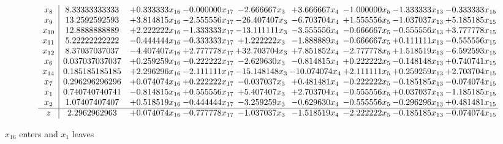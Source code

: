 \documentclass[10pt]{article}
\begin{document}
 \[\begin{array}{c| c c@{\hskip 2pt} c@{\hskip 2pt} c@{\hskip 2pt} c@{\hskip 2pt} c@{\hskip 2pt} c@{\hskip 2pt} c@{\hskip 2pt} }
 x_{8}   &  8.33333333333 & + 0.333333 x_{16} & -0.000000 x_{17} & -2.666667 x_{3} & + 3.666667 x_{4} & -1.000000 x_{5} & -1.333333 x_{13} & -0.333333 x_{15}\\
 x_{9}   &  13.2592592593 & + 3.814815 x_{16} & -2.555556 x_{17} & -26.407407 x_{3} & -6.703704 x_{4} & + 1.555556 x_{5} & -1.037037 x_{13} & + 5.185185 x_{15}\\
 x_{10}   &  12.8888888889 & + 2.222222 x_{16} & -1.333333 x_{17} & -13.111111 x_{3} & -3.555556 x_{4} & -0.666667 x_{5} & -0.555556 x_{13} & + 3.777778 x_{15}\\
 x_{11}   &  5.22222222222 & -0.444444 x_{16} & -0.333333 x_{17} & + 1.222222 x_{3} & -1.888889 x_{4} & -0.666667 x_{5} & + 0.111111 x_{13} & -0.555556 x_{15}\\
 x_{12}   &  8.37037037037 & -4.407407 x_{16} & + 2.777778 x_{17} & + 32.703704 x_{3} & + 7.851852 x_{4} & -2.777778 x_{5} & + 1.518519 x_{13} & -6.592593 x_{15}\\
 x_{6}   &  0.037037037037 & + 0.259259 x_{16} & -0.222222 x_{17} & -2.629630 x_{3} & -0.814815 x_{4} & + 0.222222 x_{5} & -0.148148 x_{13} & + 0.740741 x_{15}\\
 x_{14}   &  0.185185185185 & + 2.296296 x_{16} & -2.111111 x_{17} & -15.148148 x_{3} & -10.074074 x_{4} & + 2.111111 x_{5} & + 0.259259 x_{13} & + 2.703704 x_{15}\\
 x_{7}   &  0.296296296296 & + 0.074074 x_{16} & + 0.222222 x_{17} & -0.037037 x_{3} & + 0.481481 x_{4} & -0.222222 x_{5} & -0.185185 x_{13} & -0.074074 x_{15}\\
 x_{1}   &  0.740740740741 & -0.814815 x_{16} & + 0.555556 x_{17} & + 5.407407 x_{3} & + 2.703704 x_{4} & -0.555556 x_{5} & + 0.037037 x_{13} & -1.185185 x_{15}\\
 x_{2}   &  1.07407407407 & + 0.518519 x_{16} & -0.444444 x_{17} & -3.259259 x_{3} & -0.629630 x_{4} & -0.555556 x_{5} & -0.296296 x_{13} & + 0.481481 x_{15}\\
\hline
z    &  2.2962962963 & + 0.074074 x_{16} & -0.777778 x_{17} & -1.037037 x_{3} & -1.518519 x_{4} & -2.222222 x_{5} & -0.185185 x_{13} & -0.074074 x_{15}\\
\end{array}\]


 $ x_{16} $ enters and $ x_{1} $ leaves 
\end{document}
